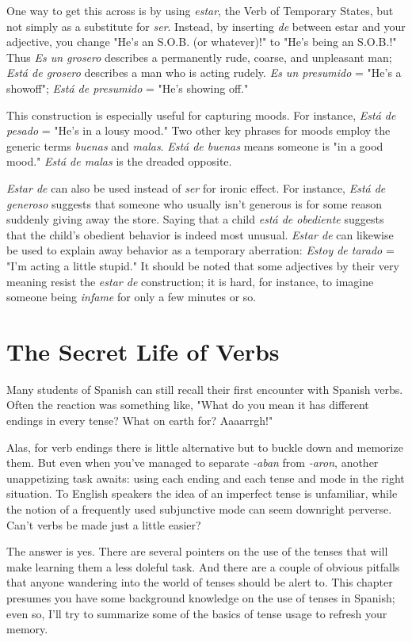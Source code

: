 \documentclass[14pt,a4paper,oneside]{memoir}
\begin{document}
One way to get this across is by using \emph{estar}, the Verb of Temporary States, but not simply as a substitute for \emph{ser}. Instead, by inserting \emph{de} between estar and your adjective, you change "He's an S.O.B.
(or whatever)!" to "He's being an S.O.B.!" Thus \emph{Es un grosero} describes
a permanently rude, coarse, and unpleasant man; \emph{Está de grosero} describes a man who is acting rudely. \emph{Es un presumido} = "He's a showoff"; \emph{Está de presumido} = "He's showing off."

This construction is especially useful for capturing moods. For
instance, \emph{Está de pesado} = "He's in a lousy mood." Two other key
phrases for moods employ the generic terms \emph{buenas} and \emph{malas}. \emph{Está
	de buenas} means someone is "in a good mood." \emph{Está de malas} is the
dreaded opposite.

\emph{Estar de} can also be used instead of \emph{ser} for ironic effect. For
instance, \emph{Está de generoso} suggests that someone who usually isn't
generous is for some reason suddenly giving away the store. Saying
that a child \emph{está de obediente} suggests that the child's obedient behavior is indeed most unusual. \emph{Estar de} can likewise be used to explain
away behavior as a temporary aberration: \emph{Estoy de tarado} = "I'm acting a little stupid." It should be noted that some adjectives by their
very meaning resist the \emph{estar de} construction; it is hard, for instance,
to imagine someone being \emph{infame} for only a few minutes or so.

\chapter{The Secret Life of Verbs}

Many students of Spanish can still recall their first encounter
with Spanish verbs. Often the reaction was something like, "What do
you mean it has different endings in every tense? What on earth for?
Aaaarrgh!"

Alas, for verb endings there is little alternative but to buckle
down and memorize them. But even when you've managed to separate
\emph{-aban} from \emph{-aron}, another unappetizing task awaits: using each ending
and each tense and mode in the right situation. To English speakers
the idea of an imperfect tense is unfamiliar, while the notion of a frequently used subjunctive mode can seem downright perverse. Can't
verbs be made just a little easier?

The answer is yes. There are several pointers on the use of the
tenses that will make learning them a less doleful task. And there are
a couple of obvious pitfalls that anyone wandering into the world of
tenses should be alert to. This chapter presumes you have some background knowledge on the use of tenses in Spanish; even so, I'll try to
summarize some of the basics of tense usage to refresh your memory.
\end{document}
